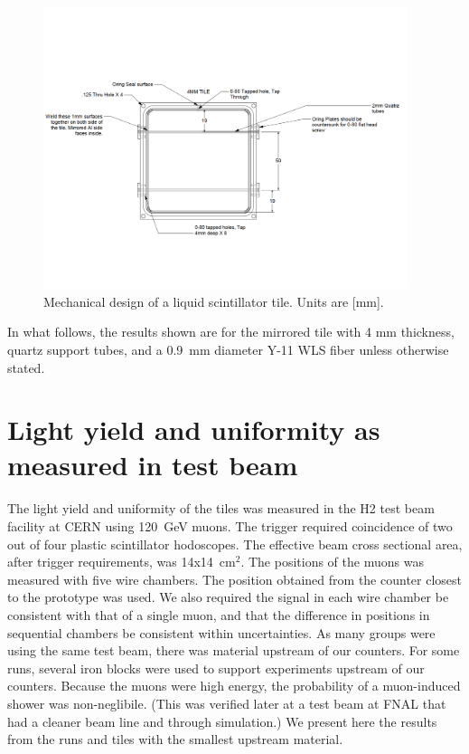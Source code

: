 \documentclass[review]{elsarticle}
\begin{document}
\begin{figure}[!ht]
\begin{center}
\includegraphics[width=0.95\textwidth]{./figures/mechanicaldesign.pdf}
\caption{Mechanical design of a liquid scintillator tile. Units are
  [mm].}
\label{fig:tiledesign}
\end{center}
\end{figure}

In what follows, the results shown are for the mirrored tile with 4 mm
thickness, quartz support tubes, and a 0.9~mm diameter Y-11 WLS fiber
unless otherwise stated.

\section{Light yield and uniformity as measured in test beam}

The light yield and uniformity of the tiles was measured in the H2
test beam facility at CERN using 120~GeV muons. The trigger required
coincidence of two out of four plastic scintillator hodoscopes. The
effective beam cross sectional area, after trigger requirements, was
14x14~cm$^2$. The positions of the muons was measured with five
wire chambers. The position obtained from the counter closest to the
prototype was used. We also required the signal in each wire chamber
be consistent with that of a single muon, and that the difference in
positions in sequential chambers be consistent within uncertainties.
As many groups were using the same test beam, there was material
upstream of our counters. For some runs, several iron blocks were
used to support experiments upstream of our counters. Because the
muons were high energy, the probability of a muon-induced shower was
non-neglibile. (This was verified later at a test beam at FNAL that
had a cleaner beam line and through simulation.) We present here the
results from the runs and tiles with the smallest upstream material.
\end{document}
